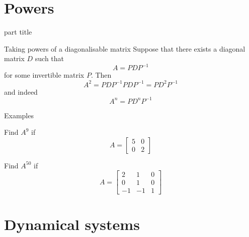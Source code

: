 \documentclass{beamer}
\begin{document}
\section{Powers}

\begin{frame}
\begin{beamercolorbox}[sep=12pt,center]{part title}
\insertsection\par
\end{beamercolorbox}
\end{frame}


\begin{frame}{Taking powers of a diagonalisable matrix}
Suppose that there exists a diagonal matrix $D$ such that
\begin{equation*}
A = P D P^{-1}
\end{equation*}
for some invertible matrix $P$.
Then
\begin{equation*}
A^2 = PDP^{-1}PDP^{-1} = PD^2P^{-1}
\end{equation*}
and indeed
\begin{equation*}
A^n = PD^nP^{-1}
\end{equation*}
\end{frame}

\begin{frame}{Examples}
\begin{example}
	Find $A^9$ if
	\begin{equation*}
	A = \left[
	\begin{matrix}
	5&0\\
	0&2
	\end{matrix}
	\right]
	\end{equation*}
\end{example}
\begin{example}
	Find $A^{50}$ if 
	\begin{equation*}
	A = \left[
	\begin{matrix}
	2&1&0\\
	0&1&0\\
	-1&-1&1
	\end{matrix}
	\right]
	\end{equation*}
\end{example}
\end{frame}

\section{Dynamical systems}
\end{document}
